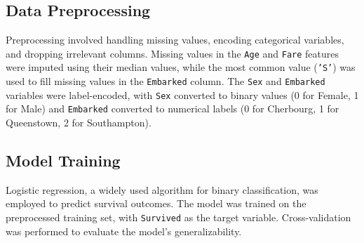 \documentclass[12pt]{article}
\begin{document}
\subsection{Data Preprocessing}
Preprocessing involved handling missing values, encoding categorical variables, and dropping irrelevant columns. Missing values in the \texttt{Age} and \texttt{Fare} features were imputed using their median values, while the most common value (\texttt{'S'}) was used to fill missing values in the \texttt{Embarked} column. The \texttt{Sex} and \texttt{Embarked} variables were label-encoded, with \texttt{Sex} converted to binary values (0 for Female, 1 for Male) and \texttt{Embarked} converted to numerical labels (0 for Cherbourg, 1 for Queenstown, 2 for Southampton).

\subsection{Model Training}
Logistic regression, a widely used algorithm for binary classification, was employed to predict survival outcomes. The model was trained on the preprocessed training set, with \texttt{Survived} as the target variable. Cross-validation was performed to evaluate the model's generalizability.
\end{document}
